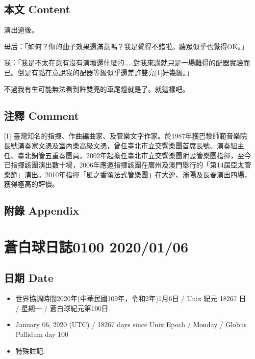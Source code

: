 \documentclass[a5paper, 12pt
]{book}
\providecommand{\tightlist}{%
  \setlength{\itemsep}{0pt}\setlength{\parskip}{0pt}}
\begin{document}
\hypertarget{ux672cux6587-content-35}{%
\subsection{本文 Content}\label{ux672cux6587-content-35}}

演出過後。

母后：「如何？你的曲子效果還滿意嗎？我是覺得不錯啦。聽眾似乎也覺得OK。」

我：「我是不太在意有沒有演壞還什麼的\ldots\ldots 對我來講就只是一場難得的配器實驗而已。倒是有點在意說我的配器等級似乎還差許雙亮{[}1{]}好幾級。」

不過我有生可能無法看到許雙亮的車尾燈就是了。就這樣吧。

\hypertarget{ux6ce8ux91cb-comment-34}{%
\subsection{注釋 Comment}\label{ux6ce8ux91cb-comment-34}}

{[}1{]}
臺灣知名的指揮、作曲編曲家、及管樂文字作家。於1987年獲巴黎師範音樂院長號演奏家文憑及室內樂高級文憑，曾任臺北市立交響樂團首席長號、演奏組主任、臺北銅管五重奏團員。2002年起擔任臺北市立交響樂團附設管樂團指揮，至今已指揮該團演出數十場，2006年應邀指揮該團在廣州及澳門舉行的「第14屆亞太管樂節」演出。2010年指揮「風之香頌法式管樂團」在大連、瀋陽及長春演出四場，獲得極高的評價。

\hypertarget{ux9644ux9304-appendix-35}{%
\subsection{附錄 Appendix}\label{ux9644ux9304-appendix-35}}

\hypertarget{ux84bcux767dux7403ux65e5ux8a8c0100-20200106}{%
\section{蒼白球日誌0100
2020/01/06}\label{ux84bcux767dux7403ux65e5ux8a8c0100-20200106}}

\hypertarget{ux65e5ux671f-date-36}{%
\subsection{日期 Date}\label{ux65e5ux671f-date-36}}

\begin{itemize}
\tightlist
\item
  世界協調時間2020年(中華民國109年，令和2年)1月6日 / Unix 紀元 18267 日
  / 星期一 / 蒼白球紀元第100日
\item
  January 06, 2020 (UTC) / 18267 days since Unix Epoch / Monday / Globus
  Pallidum day 100
\item
  特殊註記:
\end{itemize}
\end{document}
